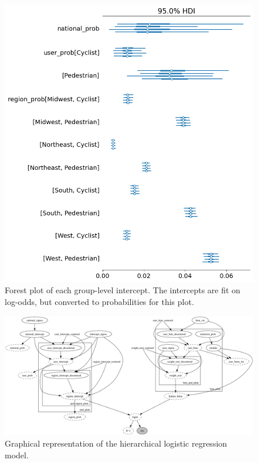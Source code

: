 \documentclass[12pt]{article}
\begin{document}
\begin{figure}[h]
    \centering
    \includegraphics[width=\textwidth]{images/prob_intercepts.png}
    \caption{Forest plot of each group-level intercept. The intercepts are fit on log-odds,
        but converted to probabilities for this plot.}
    \label{fig:prob_intercepts}
\end{figure}


\begin{landscape}
    \begin{figure}[h]
        \centering
        \includegraphics[width=\textwidth]{images/model_graph.png}
        \caption{Graphical representation of the hierarchical logistic regression model.}
        \label{fig:model_graph}
    \end{figure}
\end{landscape}
\end{document}
